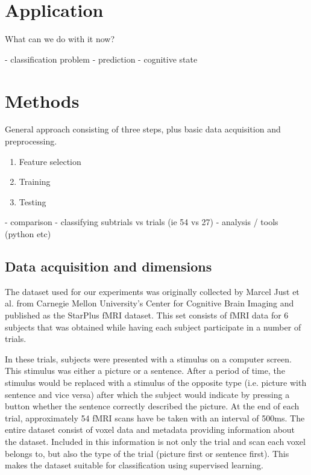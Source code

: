 \documentclass[preprint,journal,11pt]{vgtc}
\begin{document}


\section{Application}
\label{sec:application}


What can we do with it now?

- classification problem
- prediction
- cognitive state
\section{Methods}
\label{sec:methods}
General approach consisting of three steps, plus basic data acquisition and preprocessing.
\begin{enumerate}
  \item Feature selection
  \item Training
  \item Testing
\end{enumerate}



- comparison
- classifying subtrials vs trials (ie 54 vs 27)
- analysis / tools (python etc)

\subsection{Data acquisition and dimensions}
The dataset used for our experiments was originally collected by Marcel Just et al. from Carnegie Mellon University's Center for Cognitive Brain Imaging and published as the StarPlus fMRI dataset. This set consists of fMRI data for 6 subjects that was obtained while having each subject participate in a number of trials.

In these trials, subjects were presented with a stimulus on a computer screen. This stimulus was either a picture or a sentence. After a period of time, the stimulus would be replaced with a stimulus of the opposite type (i.e. picture with sentence and vice versa) after which the subject would indicate by pressing a button whether the sentence correctly described the picture. At the end of each trial, approximately 54 fMRI scans have be taken with an interval of 500ms.
The entire dataset consist of voxel data and metadata providing information about the dataset. Included in this information is not only the trial and scan each voxel belongs to, but also the type of the trial (picture first or sentence first). This makes the dataset suitable for classification using supervised learning.
\end{document}
